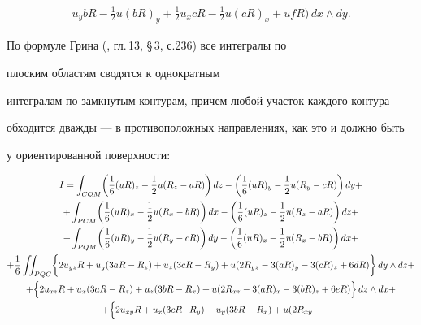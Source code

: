 \begin{pf}
\begin{gather*}
u_{y}bR-\frac{1}{2} u(bR)_{y}+


\frac{1}{2} u_{x}cR-\frac{1}{2} u(cR)_{x}+ufR\biggr) \, dx\wedge dy.


\end{gather*}





По формуле Грина (\cite{Zo2}, гл.\,13, \S\,3, с.236) все интегралы по


плоским областям сводятся к однократным


интегралам по замкнутым контурам, причем любой участок каждого контура


обходится дважды --- в противоположных направлениях, как это и должно быть


у ориентированной поверхности:


\begin{gather*}


I =\int_{CQM} \biggl( \frac{1}{6} (uR)_{z}-\frac{1}{2} u(R_{z}-aR)\biggr) \,


dz-\biggl( \frac{1}{6} (uR)_{y}-\frac{1}{2} u(R_{y}-cR)\biggr) \, dy+\\


%


 +\int_{PCM} \biggl( \frac{1}{6} (uR)_{x}-\frac{1}{2} u(R_{x}-bR)\biggr) \,


dx-\biggl( \frac{1}{6} (uR)_{z}-\frac{1}{2} u(R_{z}-aR)\biggr) \, dz+\\


%


 +\int_{PQM} \biggl( \frac{1}{6} (uR)_{y}-\frac{1}{2} u(R_{y}-cR)\biggr) \,


dy-\biggl( \frac{1}{6} (uR)_{x}-\frac{1}{2} u(R_{x}-bR)\biggr) \, dx+\\


%


 +\frac{1}{6} \iint_{PQC} \biggl \{


2u_{yz}R+u_{y}(3aR-R_{z})+u_{z}(3cR-R_{y})+u(2R_{yz}-3(aR)_{y}-3(cR)_{z}+


6dR)\biggr \} \, dy\wedge dz+\\


 +\Bigl \{ 2u_{xz}R+u_{x}(3aR-R_{z})+u_{z}(3bR-


R_{x})+u(2R_{xz}-3(aR)_{x}-


3(bR)_{z}+6eR)\Bigr \} \, dz\wedge dx+\\


 +\Bigl \{


2u_{xy}R+u_{x}(3cR-\Bigr. R_{y})+u_{y}(3bR-R_{x})+u(2R_{xy}-



\end{gather*}
\end{pf}

